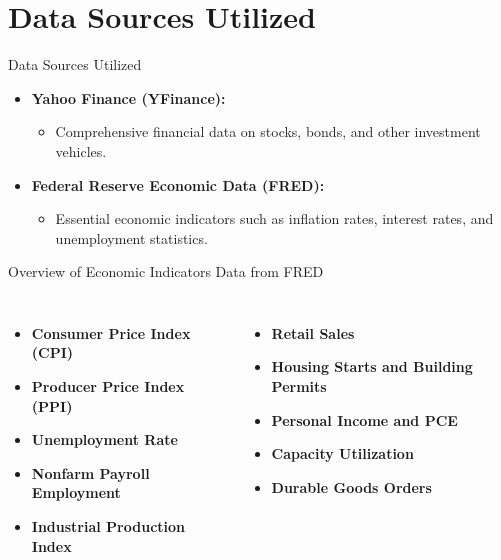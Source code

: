 \documentclass{beamer}
\begin{document}
\section{Data Sources Utilized}
\begin{frame}{Data Sources Utilized}
    \begin{itemize}
        \item \textbf{Yahoo Finance (YFinance):}
        \begin{itemize}
            \item Comprehensive financial data on stocks, bonds, and other investment vehicles.
        \end{itemize}
        \item \textbf{Federal Reserve Economic Data (FRED):}
        \begin{itemize}
            \item Essential economic indicators such as inflation rates, interest rates, and unemployment statistics.
        \end{itemize}
    \end{itemize}
\end{frame}

\begin{frame}{Overview of Economic Indicators Data from FRED}
    \begin{columns}
        \begin{itemize}
            \item \textbf{Consumer Price Index (CPI)}
            \item \textbf{Producer Price Index (PPI)}
            \item \textbf{Unemployment Rate}
            \item \textbf{Nonfarm Payroll Employment}
            \item \textbf{Industrial Production Index}
        \end{itemize}
        \begin{itemize}
            \item \textbf{Retail Sales}
            \item \textbf{Housing Starts and Building Permits}
            \item \textbf{Personal Income and PCE}
            \item \textbf{Capacity Utilization}
            \item \textbf{Durable Goods Orders}
        \end{itemize}
    \end{columns}
\end{frame}
\end{document}
